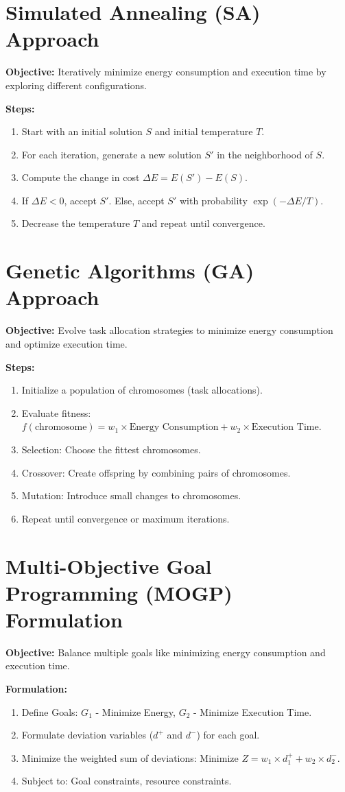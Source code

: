 \documentclass{article}
\begin{document}
\section*{Simulated Annealing (SA) Approach}
\textbf{Objective:} Iteratively minimize energy consumption and execution time by exploring different configurations.

\textbf{Steps:}
\begin{enumerate}
    \item Start with an initial solution \(S\) and initial temperature \(T\).
    \item For each iteration, generate a new solution \(S'\) in the neighborhood of \(S\).
    \item Compute the change in cost \(\Delta E = E(S') - E(S)\).
    \item If \(\Delta E < 0\), accept \(S'\). Else, accept \(S'\) with probability \(\exp(-\Delta E / T)\).
    \item Decrease the temperature \(T\) and repeat until convergence.
\end{enumerate}

\section*{Genetic Algorithms (GA) Approach}
\textbf{Objective:} Evolve task allocation strategies to minimize energy consumption and optimize execution time.

\textbf{Steps:}
\begin{enumerate}
    \item Initialize a population of chromosomes (task allocations).
    \item Evaluate fitness: \(f(\text{chromosome}) = w_1 \times \text{Energy Consumption} + w_2 \times \text{Execution Time}\).
    \item Selection: Choose the fittest chromosomes.
    \item Crossover: Create offspring by combining pairs of chromosomes.
    \item Mutation: Introduce small changes to chromosomes.
    \item Repeat until convergence or maximum iterations.
\end{enumerate}

\section*{Multi-Objective Goal Programming (MOGP) Formulation}
\textbf{Objective:} Balance multiple goals like minimizing energy consumption and execution time.

\textbf{Formulation:}
\begin{enumerate}
    \item Define Goals: \(G_1\) - Minimize Energy, \(G_2\) - Minimize Execution Time.
    \item Formulate deviation variables (\(d^+\) and \(d^-\)) for each goal.
    \item Minimize the weighted sum of deviations: \(\text{Minimize } Z = w_1 \times d_1^+ + w_2 \times d_2^-\).
    \item Subject to: Goal constraints, resource constraints.
\end{enumerate}
\end{document}
